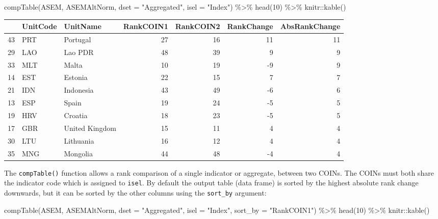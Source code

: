 \documentclass[
]{book}
\newenvironment{Shaded}{\begin{snugshade}}{\end{snugshade}}
\newcommand{\AttributeTok}[1]{\textcolor[rgb]{0.77,0.63,0.00}{#1}}
\newcommand{\DecValTok}[1]{\textcolor[rgb]{0.00,0.00,0.81}{#1}}
\newcommand{\FunctionTok}[1]{\textcolor[rgb]{0.00,0.00,0.00}{#1}}
\newcommand{\NormalTok}[1]{#1}
\newcommand{\SpecialCharTok}[1]{\textcolor[rgb]{0.00,0.00,0.00}{#1}}
\newcommand{\StringTok}[1]{\textcolor[rgb]{0.31,0.60,0.02}{#1}}
\begin{document}
\begin{Shaded}
\begin{Highlighting}[]
\FunctionTok{compTable}\NormalTok{(ASEM, ASEMAltNorm, }\AttributeTok{dset =} \StringTok{"Aggregated"}\NormalTok{, }\AttributeTok{isel =} \StringTok{"Index"}\NormalTok{) }\SpecialCharTok{\%\textgreater{}\%}
  \FunctionTok{head}\NormalTok{(}\DecValTok{10}\NormalTok{) }\SpecialCharTok{\%\textgreater{}\%}
\NormalTok{  knitr}\SpecialCharTok{::}\FunctionTok{kable}\NormalTok{()}
\end{Highlighting}
\end{Shaded}

\begin{tabular}{l|l|l|r|r|r|r}
\hline
  & UnitCode & UnitName & RankCOIN1 & RankCOIN2 & RankChange & AbsRankChange\\
\hline
43 & PRT & Portugal & 27 & 16 & 11 & 11\\
\hline
29 & LAO & Lao PDR & 48 & 39 & 9 & 9\\
\hline
33 & MLT & Malta & 10 & 19 & -9 & 9\\
\hline
14 & EST & Estonia & 22 & 15 & 7 & 7\\
\hline
21 & IDN & Indonesia & 43 & 49 & -6 & 6\\
\hline
13 & ESP & Spain & 19 & 24 & -5 & 5\\
\hline
19 & HRV & Croatia & 18 & 23 & -5 & 5\\
\hline
17 & GBR & United Kingdom & 15 & 11 & 4 & 4\\
\hline
30 & LTU & Lithuania & 16 & 12 & 4 & 4\\
\hline
35 & MNG & Mongolia & 44 & 48 & -4 & 4\\
\hline
\end{tabular}

The \texttt{compTable()} function allows a rank comparison of a single indicator or aggregate, between two COINs. The COINs must both share the indicator code which is assigned to \texttt{isel}. By default the output table (data frame) is sorted by the highest absolute rank change downwards, but it can be sorted by the other columns using the \texttt{sort\_by} argument:

\begin{Shaded}
\begin{Highlighting}[]
\FunctionTok{compTable}\NormalTok{(ASEM, ASEMAltNorm, }\AttributeTok{dset =} \StringTok{"Aggregated"}\NormalTok{, }\AttributeTok{isel =} \StringTok{"Index"}\NormalTok{, }\AttributeTok{sort\_by =} \StringTok{"RankCOIN1"}\NormalTok{) }\SpecialCharTok{\%\textgreater{}\%}
  \FunctionTok{head}\NormalTok{(}\DecValTok{10}\NormalTok{) }\SpecialCharTok{\%\textgreater{}\%}
\NormalTok{  knitr}\SpecialCharTok{::}\FunctionTok{kable}\NormalTok{()}
\end{Highlighting}
\end{Shaded}
\end{document}
